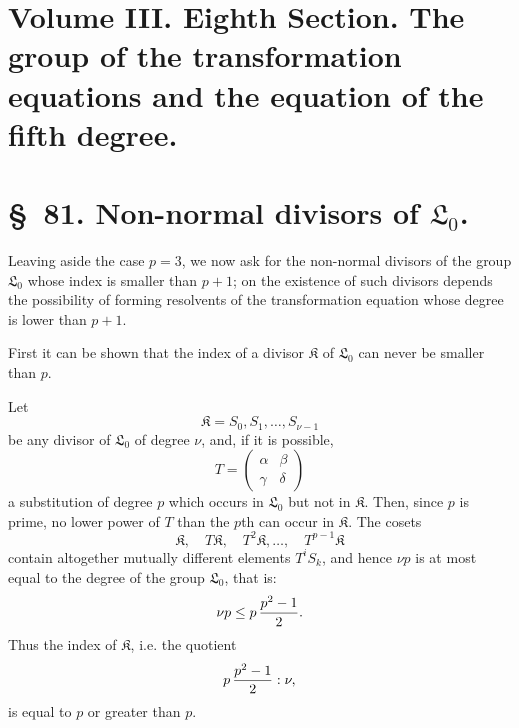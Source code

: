 \documentclass[11pt]{article}
\providecommand{\Lzero}{\mathfrak L_0}
\providecommand{\Kgrp}{\mathfrak K}
\begin{document}
\clearpage
\section*{Volume III. Eighth Section. The group of the transformation equations and the equation of the fifth degree.}

\section*{\S~81. Non-normal divisors of $\Lzero$.}

Leaving aside the case $p=3$, we now ask for the non-normal divisors of the group $\Lzero$ whose index is smaller than $p+1$; on the existence of such divisors depends the possibility of forming resolvents of the transformation equation whose degree is lower than $p+1$.

First it can be shown that the index of a divisor $\Kgrp$ of $\Lzero$ can never be smaller than $p$.

Let
\begin{equation}
 \Kgrp=S_0,S_1,\ldots,S_{\nu-1}
\tag{1}
\end{equation}
be any divisor of $\Lzero$ of degree $\nu$, and, if it is possible,
\begin{equation}
 T=\begin{pmatrix}\alpha&\beta\\ \gamma&\delta\end{pmatrix}
\tag{2}
\end{equation}
a substitution of degree $p$ which occurs in $\Lzero$ but not in $\Kgrp$. Then, since $p$ is prime, no lower power of $T$ than the $p$th can occur in $\Kgrp$. The cosets
\begin{equation}
 \Kgrp,\quad T\Kgrp,\quad T^2\Kgrp,\ldots,\quad T^{p-1}\Kgrp
\tag{3}
\end{equation}
contain altogether mutually different elements $T^iS_k$, and hence $\nu p$ is at most equal to the degree of the group $\Lzero$, that is:
\[
 \nu p\leq p\,{p^2-1\over2}.
\]
Thus the index of $\Kgrp$, i.e. the quotient
\[
 p\,{p^2-1\over2}:\nu,
\]
is equal to $p$ or greater than $p$.
\end{document}
